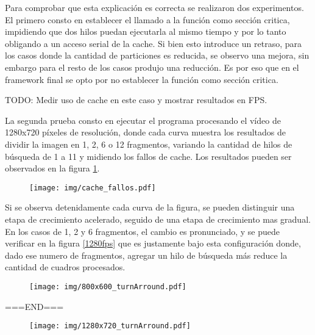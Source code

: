 Para comprobar que esta explicación es correcta se realizaron dos experimentos.
El primero consto en establecer el llamado a la función como sección critica,
impidiendo que dos hilos puedan ejecutarla al mismo tiempo y por lo tanto
obligando a un acceso serial de la cache. Si bien esto introduce un retraso,
para los casos donde la cantidad de particiones es reducida, se observo una
mejora, sin embargo para el resto de los casos produjo una reducción. Es por eso
que en el framework final se opto por no establecer la función como sección
critica.

TODO: Medir uso de cache en este caso y mostrar resultados en FPS.

La segunda prueba consto en ejecutar el programa procesando el vídeo de 1280x720
píxeles de resolución, donde cada curva muestra los resultados de dividir la
imagen en 1, 2, 6 o 12 fragmentos, variando la cantidad de hilos de búsqueda de
1 a 11 y midiendo los fallos de cache. Los resultados pueden ser observados en
la figura \ref{cacheFallos}.

\begin{figure}[!h]

	\texttt{[image: img/cache\_fallos.pdf]}
	\caption{}
	\label{cacheFallos}

\end{figure}

Si se observa detenidamente cada curva de la figura, se pueden distinguir una
etapa de crecimiento acelerado, seguido de una etapa de crecimiento mas gradual.
En los casos de 1, 2 y 6 fragmentos, el cambio es pronunciado, y se puede
verificar en la figura \ref{1280fps} que es justamente bajo esta configuración
donde, dado ese numero de fragmentos, agregar un hilo de búsqueda más reduce la
cantidad de cuadros procesados.

\begin{figure}[h]

	\texttt{[image: img/800x600\_turnArround.pdf]}
	\caption{}
	\label{800turnArround}

\end{figure}

===END===

\begin{figure}[h]

	\texttt{[image: img/1280x720\_turnArround.pdf]}
	\caption{}
	\label{1280turnArround}

\end{figure}
